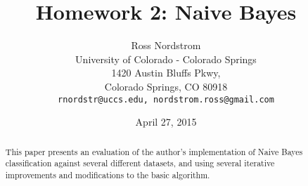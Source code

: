 \documentclass{sig-alternate}
\begin{document}
\title{Homework 2: Naive Bayes}
\author{Ross Nordstrom\\
        University of Colorado - Colorado Springs\\
        1420 Austin Bluffs Pkwy,\\
        Colorado Springs, CO 80918\\
        \texttt{rnordstr@uccs.edu, nordstrom.ross@gmail.com}
       }
\date{April 27, 2015}

\maketitle

\begin{abstract}
   This paper presents an evaluation of the author's implementation of Naive Bayes classification against
   several different datasets, and using several iterative improvements and modifications to the basic algorithm.
\end{abstract}






{}

\end{document}
